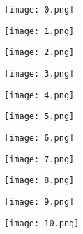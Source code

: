 \documentclass[12pt]{article}
\begin{document}
\begin{figure}[H]
	\centering
	\begin{minipage}{.5\textwidth}
		\centering
		\texttt{[image: 0.png]}
	\end{minipage}%
\end{figure}
\begin{figure}[H]
	\centering
	\begin{minipage}{.5\textwidth}
		\centering
		\texttt{[image: 1.png]}
	\end{minipage}%
	\begin{minipage}{.5\textwidth}
		\centering
		\texttt{[image: 2.png]}
	\end{minipage}
\end{figure}

\begin{figure}[H]
	\centering
	\begin{minipage}{.5\textwidth}
		\centering
		\texttt{[image: 3.png]}
	\end{minipage}%
	\begin{minipage}{.5\textwidth}
		\centering
		\texttt{[image: 4.png]}
	\end{minipage}
\end{figure}

\begin{figure}[H]
	\centering
	\begin{minipage}{.5\textwidth}
		\centering
		\texttt{[image: 5.png]}
	\end{minipage}%
	\begin{minipage}{.5\textwidth}
		\centering
		\texttt{[image: 6.png]}
	\end{minipage}
\end{figure}

\begin{figure}[H]
	\centering
	\begin{minipage}{.5\textwidth}
		\centering
		\texttt{[image: 7.png]}
	\end{minipage}%
	\begin{minipage}{.5\textwidth}
		\centering
		\texttt{[image: 8.png]}
	\end{minipage}
\end{figure}

\begin{figure}[H]
	\centering
	\begin{minipage}{.5\textwidth}
		\centering
		\texttt{[image: 9.png]}
	\end{minipage}%
	\begin{minipage}{.5\textwidth}
		\centering
		\texttt{[image: 10.png]}
	\end{minipage}
\end{figure}
\end{document}
